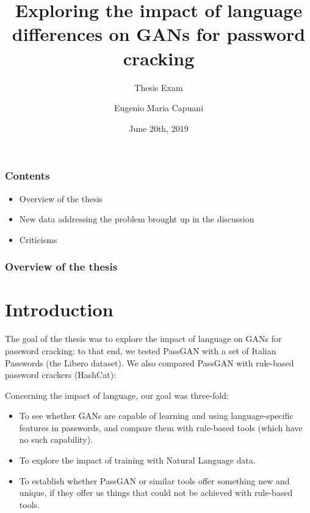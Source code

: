 \documentclass{beamer}
\title{Exploring the impact of language differences on GANs for password cracking}
\subtitle{Thesis Exam}
\author{Eugenio Maria Capuani}
\date{June 20th, 2019}
\begin{document}
\begin{frame}
\titlepage
\end{frame}

\begin{frame}
\frametitle{Contents}
\begin{itemize}
\item Overview of the thesis
\item New data addressing the problem brought up in the discussion
\item Criticisms    
\end{itemize}
\end{frame}

\begin{frame}
\frametitle{Overview of the thesis}
    \section{Introduction}
    The goal of the thesis was to explore the impact of language on GANs for password cracking: to that end, we tested PassGAN with a set of Italian Passwords (the Libero dataset).
    We also compared PassGAN with rule-based password crackers (HashCat):

Concerning the impact of language, our goal was three-fold:
    \begin{itemize}
        \item To see whether GANs are capable of learning and using language-specific features in passwords, and compare them with rule-based tools (which have no such capability).
        \item To explore the impact of training with Natural Language data.
        \item To establish whether PassGAN or similar tools offer something new and unique, if they offer us things that could not be achieved with rule-based tools.    
    \end{itemize}
\end{frame}
\end{document}
